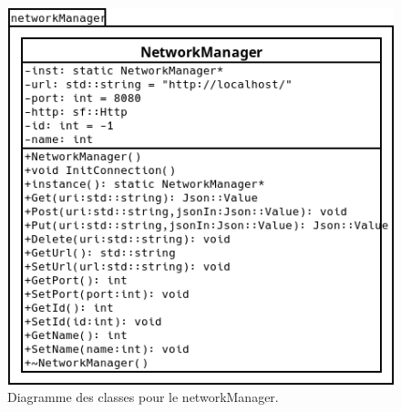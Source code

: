 \begin{figure}[p]
\centering
\includegraphics[width=0.4\paperheight]{images/networkManager.png}
\caption{\label{uml:networkManager}Diagramme des classes pour le networkManager.} 
\end{figure}
%
